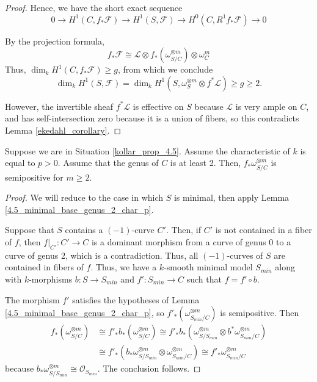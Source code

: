 \begin{proof}
Hence, we have the short exact sequence
$$0\to H^1(C, f_*\mathcal{F})\to H^1(S, \mathcal{F})\to H^0(C, R^1f_*\mathcal{F})\to 0$$

By the projection formula,
$$
f_*\mathcal{F}\cong\mathcal{L}\otimes f_*(\omega^{\otimes m}_{S/C})\otimes \omega^m_C
$$
Thus, $\dim_k H^1(C,f_{*}\mathcal{F})\ge g$, from which we conclude
$$
\dim_k H^1(S,\mathcal{F})=\dim_kH^{1}(S,\omega_{S}^{\otimes m}\otimes f^{*}\mathcal{L})\ge g\ge2.
$$

However, the invertible sheaf $f^*\mathcal{L}$ is effective on $S$ because $\mathcal{L}$ is very ample on $C$, and has self-intersection zero because it is a union of fibers, so this contradicts Lemma \ref{ekedahl_corollary}.
\end{proof}

\begin{lemma}\label{4.5_base_genus_2_char_p}
Suppose we are in Situation \ref{kollar_prop_4.5}.
Assume the characteristic of $k$ is equal to $p>0$.
Assume that the genus of $C$ is at least 2.
Then, $f_*\omega_{S/C}^{\otimes m}$ is semipositive for $m \geq 2$.
\end{lemma}

\begin{proof}
We will reduce to the case in which $S$ is minimal, then apply Lemma
\ref{4.5_minimal_base_genus_2_char_p}.

Suppose that $S$ contains a $(-1)$-curve $C'$.
Then, if $C'$ is not contained in a fiber of $f$, then $f|_{C'}:C'\to C$ is a
dominant morphism from a curve of genus 0 to a curve of genus 2, which is a
contradiction.
Thus, all $(-1)$-curves of $S$ are contained in fibers of $f$.
Thus, we have a $k$-smooth minimal model $S_{min}$ along with $k$-morphisms
$b:S\to S_{min}$ and $f':S_{min}\to C$ such that $f=f'\circ b$.

The morphism $f'$ satisfies the hypotheses of Lemma
\ref{4.5_minimal_base_genus_2_char_p}, so
$f'_*(\omega_{S_{min}/C}^{\otimes m})$ is semipositive.
Then
\begin{align*}
  f_*(\omega^{\otimes m}_{S/C})
    & \cong f'_*b_*(\omega^{\otimes m}_{S/C})
      \cong f'_*b_*(\omega^{\otimes m}_{S/S_{min}}\otimes b^*\omega^{\otimes m}_{S_{min}/C})\\
    & \cong f'_*(b_*\omega^{\otimes m}_{S/S_{min}}\otimes \omega^{\otimes m}_{S_{min}/C})
      \cong f'_*\omega^{\otimes m}_{S_{min}/C}
\end{align*}
because $b_*\omega^{\otimes m}_{S/S_{min}}\cong\mathcal{O}_{S_{min}}$.
The conclusion follows.
\end{proof}




